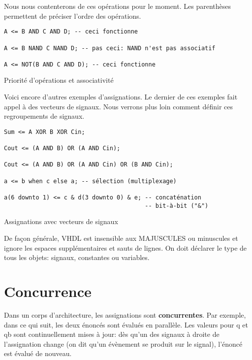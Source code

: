 \documentclass[letter, oneside]{book}
\begin{document}
Nous nous contenterons de ces opérations pour le moment. Les
parenthèses permettent de préciser l'ordre des opérations.

\begin{listing}[htbp]
\begin{verbatim}
A <= B AND C AND D; -- ceci fonctionne

A <= B NAND C NAND D; -- pas ceci: NAND n'est pas associatif

A <= NOT(B AND C AND D); -- ceci fonctionne
\end{verbatim}
\caption{Priorité d'opérations et associativité}
\end{listing}

Voici encore d'autres exemples d'assignations.  Le dernier de ces
exemples fait appel à des vecteurs de signaux. Nous verrons plus loin
comment définir ces regroupements de signaux.


\begin{listing}[htbp]
\begin{verbatim}
Sum <= A XOR B XOR Cin;

Cout <= (A AND B) OR (A AND Cin);

Cout <= (A AND B) OR (A AND Cin) OR (B AND Cin);

a <= b when c else a; -- sélection (multiplexage)

a(6 downto 1) <= c & d(3 downto 0) & e; -- concaténation 
                                        -- bit-à-bit ("&")

\end{verbatim}
\caption{Assignations avec vecteurs de signaux}
\end{listing}

De façon générale, VHDL est insensible aux MAJUSCULES ou minuscules
et ignore les espaces supplémentaires et sauts de lignes. On doit
déclarer le type de tous les objets: signaux, constantes ou variables.

\section{Concurrence}
\label{sec:org2682fae}

Dans un corps d'architecture, les assignations sont
\textbf{concurrentes}. Par exemple, dans ce qui suit, les deux énoncés sont
évalués en parallèle. Les valeurs pour q et qb sont continuellement
mises à jour: dès qu'un des signaux à droite de l'assignation change
(on dit qu'un évènement se produit sur le signal), l'énoncé est évalué
de nouveau.
\end{document}
